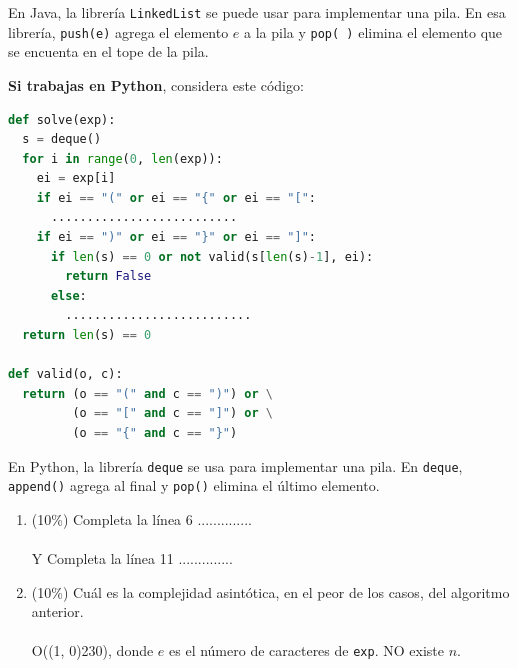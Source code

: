\documentclass[10 pt]{article}
\begin{document}
En Java, la librería \texttt{LinkedList} se puede usar 
para implementar una pila. En esa librería, \texttt{push(e)}
agrega el elemento $e$ a la pila y \texttt{pop( )} elimina
el elemento que se encuenta en el tope de la pila.


\hspace{1cm}

\textbf{Si trabajas en Python}, considera este código:

\begin{lstlisting}[language=Python]
def solve(exp):
  s = deque()
  for i in range(0, len(exp)):
    ei = exp[i]
    if ei == "(" or ei == "{" or ei == "[":
      ..........................
    if ei == ")" or ei == "}" or ei == "]":
      if len(s) == 0 or not valid(s[len(s)-1], ei):
        return False
      else:
        ..........................
  return len(s) == 0

def valid(o, c):
  return (o == "(" and c == ")") or \
         (o == "[" and c == "]") or \
         (o == "{" and c == "}")
\end{lstlisting}

En Python, la librería \texttt{deque} se usa para implementar una pila. 
En \texttt{deque}, \texttt{append()} agrega al final y \texttt{pop()} elimina el último elemento.


\begin{enumerate}[label=(\Alph*)]
  \item (10\%) Completa la línea 6  ..............\\ \\
  Y Completa la línea 11 ..............
  \item (10\%) Cuál es la complejidad asintótica, en el peor de los casos, del algoritmo anterior. \\ \\
  O(\line(1, 0){230}), donde $e$ es el número de caracteres de \texttt{exp}. NO existe $n$.
\end{enumerate}

\newpage
\end{document}
